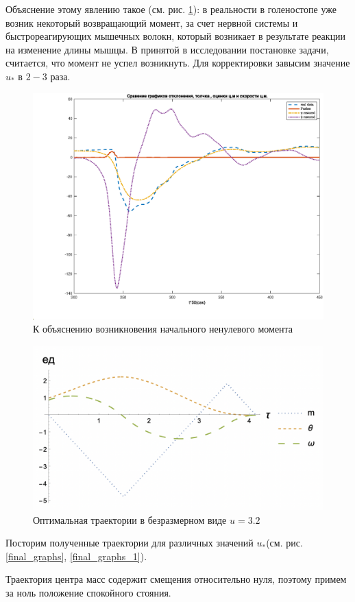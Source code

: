 \documentclass[a4paper,12pt, openany]{book}
\theoremstyle{plain} %
\theoremstyle{definition} %
\theoremstyle{remark} %
\numberwithin{equation}{chapter}
\begin{document}
{Объяснение этому явлению такое (см. рис. \ref{all_bold}): в реальности в голеностопе уже возник некоторый возвращающий момент, за счет нервной системы и быстрореагирующих мышечных волокн,
 который возникает в результате реакции на изменение длины мышцы.
В принятой в исследовании постановке задачи, считается, что момент не успел возникнуть. Для корректировки завысим значение $u_\ast$ в $2-3$ раза.
\begin{figure}[h!]
    \centering
    \includegraphics[width=0.7\linewidth]{cp3_bold.eps}
    \caption{К объяснению возникновения начального ненулевого момента}
    \label{all_bold}
\end{figure}
\begin{figure}[h!]
    \centering
    \includegraphics[width=0.7\linewidth]{3_graphs.png}
    \caption{Оптимальная траектории в безразмерном виде $u=3.2$ }
    \label{3_graphs}
\end{figure}

Посторим полученные траектории для различных значений $u_\ast$(см. рис. \ref{final_graphs}, \ref{final_graphs_1}).

Траектория центра масс содержит смещения относительно нуля, поэтому примем за ноль положение спокойного стояния.

}
\end{document}
